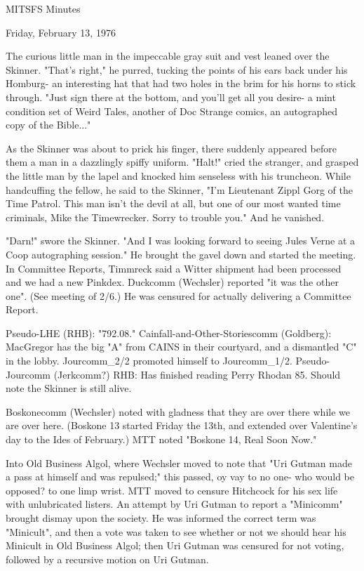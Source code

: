\documentclass[12pt]{article}
\begin{document}
\begin{center}

MITSFS Minutes

Friday, February 13, 1976

\end{center}
 
\vspace{12pt}

\setlength{\parskip}{6pt}

\noindent
The curious little man in the impeccable gray suit and vest leaned over the Skinner. "That's right," he purred, tucking the points of his ears back under his Homburg- an interesting hat that had two holes in the brim for his horns to stick through. "Just sign there at the bottom, and you'll get all you desire- a mint condition set of Weird Tales, another of Doc Strange comics, an autographed copy of the Bible..."

As the Skinner was about to prick his finger, there suddenly appeared before them a man in a dazzlingly spiffy uniform. "Halt!" cried the stranger, and grasped the little man by the lapel and knocked him senseless with his truncheon. While handcuffing the fellow, he said to the Skinner, "I'm Lieutenant Zippl Gorg of the Time Patrol. This man isn't the devil at all, but one of our most wanted time criminals, Mike the Timewrecker. Sorry to trouble you." And he vanished.

"Darn!" swore the Skinner. "And I was looking forward to seeing Jules Verne at a Coop autographing session." He brought the gavel down and started the meeting. In Committee Reports, Timmreck said a Witter shipment had been processed and we had a new Pinkdex. Duckcomm (Wechsler) reported "it was the other one". (See meeting of 2/6.) He was censured for actually delivering a Committee Report.

Pseudo-LHE (RHB): "792.08." Cainfall-and-Other-Storiescomm (Goldberg): MacGregor has the big "A" from CAINS in their courtyard, and a dismantled "C" in the lobby. Jourcomm_2/2 promoted himself to Jourcomm_1/2. Pseudo-Jourcomm (Jerkcomm?) RHB: Has finished reading Perry Rhodan 85. Should note the Skinner is still alive.

Boskonecomm (Wechsler) noted with gladness that they are over there while we are over here. (Boskone 13 started Friday the 13th, and extended over Valentine's day to the Ides of February.) MTT noted "Boskone 14, Real Soon Now."

Into Old Business Algol, where Wechsler moved to note that
"Uri Gutman made a pass at himself and was repulsed;" this passed, oy vay to no one- who would be opposed? to one limp wrist. MTT moved to censure Hitchcock for his sex life with unlubricated listers. An attempt by Uri Gutman to report a "Minicomm" brought dismay upon the society. He was informed the correct term was "Minicult", and then a vote was taken to see whether or not we should hear his Minicult in Old Business Algol; then Uri Gutman was censured for not voting, followed by a recursive motion on Uri Gutman.
\end{document}
